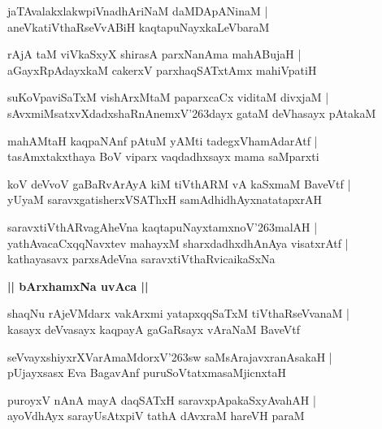 \documentclass[twoside,12pt,openright]{book}
\def\S{\char'263}
\newcounter{shloka}[chapter]
\def\uvaca#1{\centerline{{\large\textbf{#1}}}}
\begin{document}
\begin{shloka}%
jaTAvalakxlakwpiVnadhAriNaM daMDApANinaM |\\
aneVkatiVthaRseVvABiH kaqtapuNayxkaLeVbaraM 
\end{shloka}

\begin{shloka}%
rAjA taM viVkaSxyX shirasA parxNanAma mahABujaH |\\
aGayxRpAdayxkaM cakerxV parxhaqSATxtAmx mahiVpatiH 
\end{shloka}

\begin{shloka}%
suKoVpaviSaTxM vishArxMtaM paparxcaCx viditaM divxjaM |\\
sAvxmiMsatxvXdadxshaRnAnemxV\S dayx gataM deVhasayx pAtakaM
\end{shloka}

\begin{shloka}%
mahAMtaH kaqpaNAnf pAtuM yAMti tadegxVhamAdarAtf |\\
tasAmxtakxthaya BoV viparx vaqdadhxsayx mama saMparxti
\end{shloka}

\begin{shloka}%
koV deVvoV gaBaRvArAyA kiM tiVthARM vA kaSxmaM  BaveVtf |\\
yUyaM saravxgatisherxVSAThxH samAdhidhAyxnatatapxrAH 
\end{shloka}

\begin{shloka}%
saravxtiVthARvagAheVna kaqtapuNayxtamxnoV\S malAH |\\
yathAvacaCxqqNavxtev mahayxM sharxdadhxdhAnAya visatxrAtf |\\
kathayasavx parxsAdeVna saravxtiVthaRvicaikaSxNa
\end{shloka}

\uvaca{|| bArxhamxNa uvAca ||}

\begin{shloka}%
shaqNu rAjeVMdarx vakArxmi yatapxqqSaTxM tiVthaRseVvanaM |\\
kasayx deVvasayx kaqpayA gaGaRsayx vAraNaM BaveVtf
\end{shloka}

\begin{shloka}%
seVvayxshiyxrXVarAmaMdorxV\S sw saMsArajavxranAsakaH |\\
pUjayxsasx Eva BagavAnf puruSoVtatxmasaMjicnxtaH 
\end{shloka}

\begin{shloka}%
puroyxV nAnA mayA daqSATxH saravxpApakaSxyAvahAH |\\
ayoVdhAyx sarayUsAtxpiV tathA dAvxraM hareVH paraM 
\end{shloka}
\end{document}
